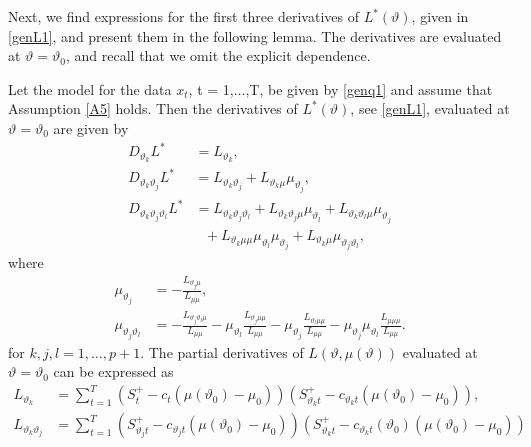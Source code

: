 {{Next, we find expressions for the first three derivatives of $L^*(\vartheta)$, given in \eqref{genL1}, and present them in the following lemma. The derivatives are evaluated at $\vartheta = \vartheta_0$, and recall that we omit the explicit dependence. 
\begin{lemma} \label{genderivatesLstar}
Let the model for the data $x_t$, t = 1,$\ldots$,T, be given by \eqref{genq1} and assume that Assumption \ref{A5} holds. Then the derivatives of $L^*(\vartheta)$, see \eqref{genL1}, evaluated at $\vartheta = \vartheta_0$ are given by
\begin{align}
      D_{\vartheta_k} L^* &=  L_{\vartheta_k}, \label{genqw11}\\
    D_{\vartheta_k \vartheta_j } L^* &=  L_{\vartheta_k  \vartheta_j} + L_{\vartheta_k \mu}\mu_{\vartheta_j} , \label{genqw12}\\
    D_{\vartheta_k \vartheta_j \vartheta_l } L^* &= L_{\vartheta_k  \vartheta_j \vartheta_l} +  L_{\vartheta_k  \vartheta_j \mu} \mu_{\vartheta_l} +  L_{\vartheta_k  \vartheta_l \mu} \mu_{\vartheta_j} \nonumber \\
&\ \  \  +   L_{\vartheta_k  \mu \mu} \mu_{\vartheta_l} \mu_{\vartheta_j}
+ L_{\vartheta_k  \mu} \mu_{\vartheta_j \vartheta_l} , \label{genqw13}
\end{align}
where 
\begin{align*}
     \mu_{\vartheta_j} &= -\frac{L_{ \vartheta_j \mu}}{L_{\mu \mu} }, \\
      \mu_{\vartheta_j \vartheta_l} &= -\frac{L_{\vartheta_j \vartheta_l \mu }}{L_{\mu \mu}} -  \mu_{\vartheta_l} \frac{  L_{ \vartheta_j \mu \mu  }}{L_{\mu \mu}}  - \mu_{\vartheta_j}  \frac{  L_{ \vartheta_l \mu \mu} }{L_{\mu \mu}} 
    -  \mu_{\vartheta_j} \mu_{\vartheta_l}  \frac{  L_{\mu \mu \mu } }{L_{\mu \mu}}.
\end{align*} 
for $k,j,l = 1,\ldots, p+1$.
The partial derivatives of $ L(\vartheta,\mu(\vartheta))$ evaluated at $\vartheta = \vartheta_0$ can be expressed as 
\begin{align*}
    L_{\vartheta_k} 
    &= \sum_{t = 1}^T \left(S_{t}^+ - c_{t}\left(\mu(\vartheta_0)-\mu_0\right)\right) \left( S_{\vartheta_k t}^+ -  c_{\vartheta_k t}\left(\mu(\vartheta_0)-\mu_0\right)\right), \\
     L_{\vartheta_k \vartheta_j } &= \sum_{t = 1}^T \left( S_{\vartheta_j t}^+ -  c_{\vartheta_j t}\left(\mu(\vartheta_0)-\mu_0\right)\right) \left( S_{\vartheta_k t}^+ -  c_{\vartheta_k t}(\vartheta_0)\left(\mu(\vartheta_0)-\mu_0\right)\right) \\

\end{align*}
\end{lemma}}}
